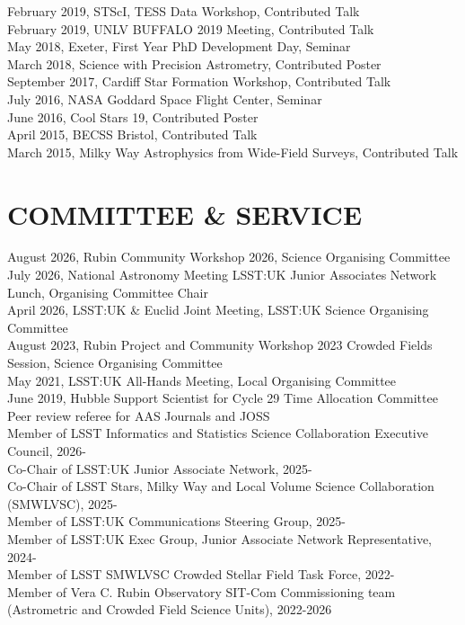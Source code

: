 \documentclass[letter, margin, 10pt]{res} %
\begin{document}
\begin{resume}
February 2019, STScI, TESS Data Workshop, Contributed Talk\\
February 2019, UNLV BUFFALO 2019 Meeting, Contributed Talk\\
May 2018, Exeter, First Year PhD Development Day, Seminar\\
March 2018, Science with Precision Astrometry, Contributed Poster\\
September 2017, Cardiff Star Formation Workshop, Contributed Talk\\
July 2016, NASA Goddard Space Flight Center, Seminar\\
June 2016, Cool Stars 19, Contributed Poster\\
April 2015, BECSS Bristol, Contributed Talk\\
March 2015, Milky Way Astrophysics from Wide-Field Surveys, Contributed Talk

 \vspace{-6pt}
\section{COMMITTEE \& SERVICE}

August 2026, Rubin Community Workshop 2026, Science Organising Committee\\
July 2026, National Astronomy Meeting LSST:UK Junior Associates Network Lunch, Organising Committee Chair\\
April 2026, LSST:UK \& Euclid Joint Meeting, LSST:UK Science Organising Committee\\
August 2023, Rubin Project and Community Workshop 2023 Crowded Fields Session, Science Organising Committee\\
May 2021, LSST:UK All-Hands Meeting, Local Organising Committee\\
June 2019, Hubble Support Scientist for Cycle 29 Time Allocation Committee\\
Peer review referee for AAS Journals and JOSS\\
Member of LSST Informatics and Statistics Science Collaboration Executive Council, 2026-\\
Co-Chair of LSST:UK Junior Associate Network, 2025-\\
Co-Chair of LSST Stars, Milky Way and Local Volume Science Collaboration (SMWLVSC), 2025-\\
Member of LSST:UK Communications Steering Group, 2025-\\
Member of LSST:UK Exec Group, Junior Associate Network Representative, 2024-\\
Member of LSST SMWLVSC Crowded Stellar Field Task Force, 2022-\\
Member of Vera C. Rubin Observatory SIT-Com Commissioning team (Astrometric and Crowded Field Science Units), 2022-2026\\


\end{resume}
\end{document}
